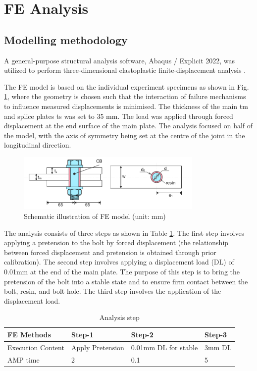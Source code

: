 \section{FE Analysis}

\subsection{Modelling methodology}

A general-purpose structural analysis software, Abaqus / Explicit 2022, was utilized to perform three-dimensional elastoplastic finite-displacement analysis \cite{Smith2020}.

The FE model is based on the individual experiment specimens \cite{derks_msc_2023} as shown in Fig. \ref{fig-FEmodel-RIBJ}, where the geometry is chosen such that the interaction of failure mechanisms to influence measured displacements is minimised. The thickness of the main tm and splice plates ts was set to 35 mm. The load was applied through forced displacement at the end surface of the main plate. The analysis focused on half of the model, with the axis of symmetry being set at the centre of the joint in the longitudinal direction.

\begin{figure}[htbp]
    \centering
    \includegraphics[width=0.8\textwidth]{imgs/app3/FEmodel-RIBJ.pdf}
    \caption{ Schematic illustration of FE model (unit: mm)}
    \label{fig-FEmodel-RIBJ}
\end{figure}

The analysis consists of three steps as shown in Table \ref{tab-app3-1}. The first step involves applying a pretension to the bolt by forced displacement (the relationship between forced displacement and pretension is obtained through prior calibration). The second step involves applying a displacement load (DL) of 0.01mm at the end of the main plate. The purpose of this step is to bring the pretension of the bolt into a stable state and to ensure firm contact between the bolt, resin, and bolt hole. The third step involves the application of the displacement load.


\begin{table}[htbp]
    \centering
    \caption{Analysis step} \label{tab-app3-1}
    \begin{tabular}{llll}
    \toprule
    FE Methods & Step-1 & Step-2 & Step-3 \\
    \midrule
    Execution Content & Apply Pretension & 0.01mm DL for stable & 3mm DL\\
    AMP time     & 2 & 0.1 & 5\\
    \bottomrule
    
    \end{tabular}
\end{table}

